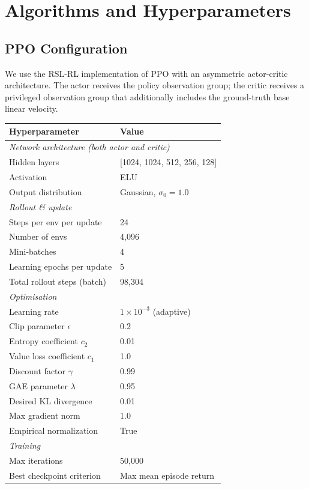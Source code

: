 \documentclass{article}
\begin{document}
\section{Algorithms and Hyperparameters}

\subsection{PPO Configuration}

We use the RSL-RL implementation of PPO \cite{rudin2022learning} with an
asymmetric actor-critic architecture.
The actor receives the policy observation group; the critic receives a
privileged observation group that additionally includes the ground-truth base
linear velocity.

\begin{center}
\begin{tabular}{ll}
  \toprule
  \textbf{Hyperparameter} & \textbf{Value} \\
  \midrule
  \multicolumn{2}{l}{\textit{Network architecture (both actor and critic)}} \\
  \quad Hidden layers & [1024, 1024, 512, 256, 128] \\
  \quad Activation & ELU \\
  \quad Output distribution & Gaussian, $\sigma_0 = 1.0$ \\
  \midrule
  \multicolumn{2}{l}{\textit{Rollout \& update}} \\
  \quad Steps per env per update & 24 \\
  \quad Number of envs & 4{,}096 \\
  \quad Mini-batches & 4 \\
  \quad Learning epochs per update & 5 \\
  \quad Total rollout steps (batch) & 98{,}304 \\
  \midrule
  \multicolumn{2}{l}{\textit{Optimisation}} \\
  \quad Learning rate & $1\times10^{-3}$ (adaptive) \\
  \quad Clip parameter $\epsilon$ & 0.2 \\
  \quad Entropy coefficient $c_2$ & 0.01 \\
  \quad Value loss coefficient $c_1$ & 1.0 \\
  \quad Discount factor $\gamma$ & 0.99 \\
  \quad GAE parameter $\lambda$ & 0.95 \\
  \quad Desired KL divergence & 0.01 \\
  \quad Max gradient norm & 1.0 \\
  \quad Empirical normalization & True \\
  \midrule
  \multicolumn{2}{l}{\textit{Training}} \\
  \quad Max iterations & 50{,}000 \\
  \quad Best checkpoint criterion & Max mean episode return \\
  \bottomrule
\end{tabular}
\end{center}
\end{document}
